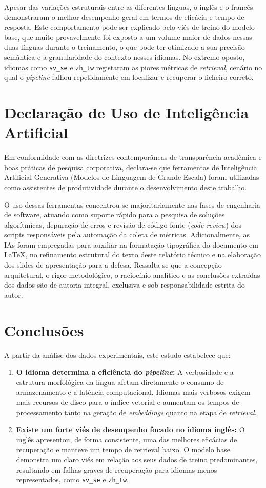 \documentclass[manuscript,screen]{acmart}
\begin{document}
Apesar das variações estruturais entre as diferentes línguas, o inglês e o francês demonstraram o melhor desempenho geral em termos de eficácia e tempo de resposta. Este comportamento pode ser explicado pelo viés de treino do modelo base, que muito provavelmente foi exposto a um volume maior de dados nessas duas línguas durante o treinamento, o que pode ter otimizado a sua precisão semântica e a granularidade do contexto nesses idiomas. No extremo oposto, idiomas como \texttt{sv\_se} e \texttt{zh\_tw} registaram as piores métricas de \textit{retrieval}, cenário no qual o \textit{pipeline} falhou repetidamente em localizar e recuperar o ficheiro correto.

\section{Declaração de Uso de Inteligência Artificial}
Em conformidade com as diretrizes contemporâneas de transparência acadêmica e boas práticas de pesquisa corporativa, declara-se que ferramentas de Inteligência Artificial Generativa (Modelos de Linguagem de Grande Escala) foram utilizadas como assistentes de produtividade durante o desenvolvimento deste trabalho.

O uso dessas ferramentas concentrou-se majoritariamente nas fases de engenharia de software, atuando como suporte rápido para a pesquisa de soluções algorítmicas, depuração de erros e revisão de código-fonte (\textit{code review}) dos scripts responsáveis pela automação da coleta de métricas. Adicionalmente, as IAs foram empregadas para auxiliar na formatação tipográfica do documento em LaTeX, no refinamento estrutural do texto deste relatório técnico e na elaboração dos slides de apresentação para a defesa. Ressalta-se que a concepção arquitetural, o rigor metodológico, o raciocínio analítico e as conclusões extraídas dos dados são de autoria integral, exclusiva e sob responsabilidade estrita do autor.

\section{Conclusões}
A partir da análise dos dados experimentais, este estudo estabelece que:
\begin{enumerate}
    \item \textbf{O idioma determina a eficiência do \textit{pipeline}:} A verbosidade e a estrutura morfológica da língua afetam diretamente o consumo de armazenamento e a latência computacional. Idiomas mais verbosos exigem mais recursos de disco para o índice vetorial e aumentam os tempos de processamento tanto na geração de \textit{embeddings} quanto na etapa de \textit{retrieval}.
    \item \textbf{Existe um forte viés de desempenho focado no idioma inglês:} O inglês apresentou, de forma consistente, uma das melhores eficácias de recuperação e manteve um tempo de retrieval baixo. O modelo base demonstra um claro viés em relação aos seus dados de treino predominantes, resultando em falhas graves de recuperação para idiomas menos representados, como \texttt{sv\_se} e \texttt{zh\_tw}.
\end{enumerate}
\end{document}
